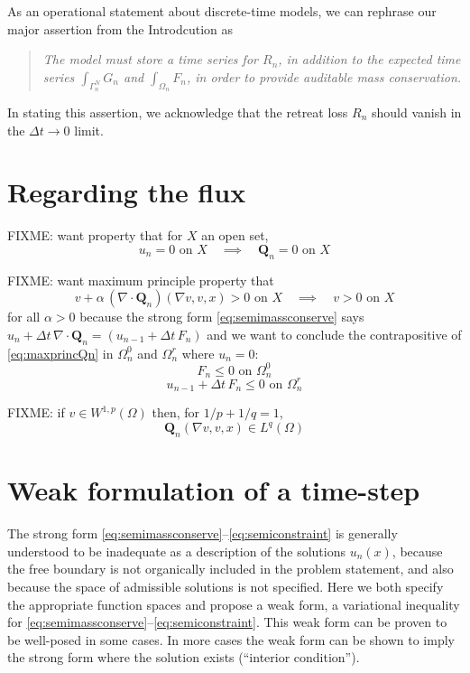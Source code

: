 \documentclass[final,leqno,onefignum,onetabnum]{siamltex1213bueler}
\newcommand\bQ{\mathbf{Q}}
\newcommand{\Div}{\nabla\cdot}
\renewcommand{\grad}{\nabla}
\begin{document}
As an operational statement about discrete-time models, we can rephrase our major assertion from the Introdcution as
\begin{quote}
\emph{The model must store a time series for $R_n$, in addition to the expected time series $\int_{\Gamma_n^N} G_n$ and $\int_{\Omega_n} F_n$, in order to provide auditable mass conservation.}
\end{quote}
In stating this assertion, we acknowledge that the retreat loss $R_n$ should vanish in the $\Delta t\to 0$ limit.


\section{Regarding the flux}

FIXME:  want property that for $X$ an open set,
\begin{equation}
u_n=0 \text{ on } X \quad \implies \quad \bQ_n=0 \text{ on } X  \label{eq:vanishingQn}
\end{equation}

FIXME:  want maximum principle property that
\begin{equation}
v + \alpha\, (\Div \bQ_n)(\grad v,v,x) > 0 \text{ on } X \quad \implies \quad v > 0 \text{ on } X  \label{eq:maxprincQn}
\end{equation}
for all $\alpha>0$ because the strong form \eqref{eq:semimassconserve} says $u_n + \Delta t\, \Div \bQ_n = (u_{n-1} + \Delta t\, F_n)$ and we want to conclude the contrapositive of \eqref{eq:maxprincQn} in $\Omega_n^0$ and $\Omega_n^r$ where $u_n=0$:
\begin{equation}
F_n \le 0  \text{ on } \Omega_n^0  \label{eq:inequalityonzero}
\end{equation}
\begin{equation}
u_{n-1} + \Delta t\, F_n \le 0  \text{ on } \Omega_n^r  \label{eq:inequalityonretreat}
\end{equation}

FIXME: if $v \in W^{1,p}(\Omega)$ then, for $1/p + 1/q = 1$,
    $$\bQ_n(\grad v,v,x) \in L^q(\Omega)$$ 

\section{Weak formulation of a time-step}  The strong form \eqref{eq:semimassconserve}--\eqref{eq:semiconstraint} is generally understood to be inadequate as a description of the solutions $u_n(x)$, because the free boundary is not organically included in the problem statement, and also because the space of admissible solutions is not specified.  Here we both specify the appropriate function spaces and propose a weak form, a variational inequality \cite{Friedman,KinderlehrerStampacchia} for \eqref{eq:semimassconserve}--\eqref{eq:semiconstraint}.  This weak form can be proven to be well-posed in some cases.  In more cases the weak form can be shown to imply the strong form where the solution exists (``interior condition'').
\end{document}
